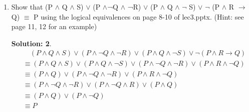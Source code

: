 \documentclass{article}
\theoremstyle{break}
\newtheorem*{solution*}{\textbf{Solution:} }
\begin{document}
\begin{enumerate}
\begin{solution*}
\begin{center}
\begin{tabular}{|c|c|c|}
                \hline
                8 & $p \lor ( p \land q) \equiv p$ & $p \lor ( p \land q) \equiv p$  \\
                \hline
                9 & $p \lor ( p \land q) \equiv p$ & $p \lor ( p \land q) \equiv p$ \\
                \hline
                10 & $p \to q \equiv \lnot p \lor q$ & $p \to q \equiv p \uparrow (q \uparrow q) $ \\
                \hline
                11 & $p\leftrightarrow q \equiv (\lnot p \lor q) \land \lnot(p \lor \lnot q ) $ & $p\leftrightarrow q \equiv  (p \uparrow q) \uparrow (p \uparrow p) \uparrow (q \uparrow q)$\\
                \hline
                \end{tabular}
        \end{center}
        \end{solution*}
        \newpage

        \item 
        Show that (P $\land$ Q $\land$ S) $\lor$ (P $\land$¬Q $\land$ ¬R) $\lor$ (P $\land$ Q $\land$ $\lnot$ S) $\lor$ $\lnot$  (P $\land$ R $\to$ Q) $\equiv$ P using
    the  logical  equivalences on  page  8-10 of  lec3.pptx.  (Hint:  see  page  11,  12 for  an 
    example)
    \begin{solution*}
        \begin{equation}
            \begin{aligned}
                &\quad (P \land Q \land S) \lor (P \land \lnot Q \land \lnot R) \lor (P \land Q \land \lnot S) \lor \lnot(P \land R \to Q) \\
                &\equiv (P \land Q \land S) \lor ( P \land Q \land \lnot S) \lor (P \land \lnot Q \land \lnot R) \lor ( P \land R \land \lnot Q ) \\
                & \equiv(P \land Q) \lor ( P \land \lnot Q \land \lnot R) \lor ( P \land R \land \lnot Q ) \\
                & \equiv(P \land \lnot Q \land \lnot R) \lor (P \land \lnot Q \land R) \lor (P \land Q) \\
                &\equiv (P \land Q) \lor (P \land \lnot Q)\\
                & \equiv P
            \end{aligned} 
        \end{equation}
    \end{solution*}

\vspace{50mm}


\end{enumerate}
\end{document}
